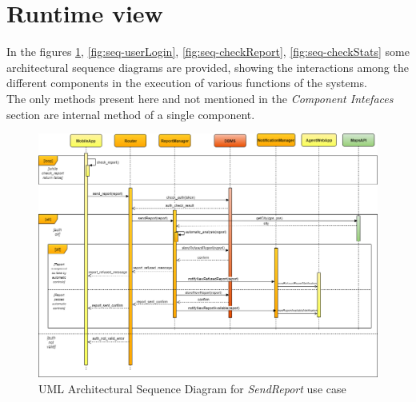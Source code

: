 \documentclass[a4paper]{report}
\begin{document}
\section{Runtime view}
In the figures \ref{fig:seq-sendReport}, \ref{fig:seq-userLogin}, \ref{fig:seq-checkReport}, \ref{fig:seq-checkStats} some architectural sequence diagrams are provided, showing the interactions among the different components in the execution of various functions of the systems. \\
The only methods present here and not mentioned in the \textit{Component Intefaces} section are internal method of a single component.

\begin{landscape}

\begin{figure}[hp]
\includegraphics[angle=0, scale=0.70]{ArchSequenceSendReport}
\caption{UML Architectural Sequence Diagram for \textit{SendReport} use case}
\label{fig:seq-sendReport}
\end{figure}

\end{landscape}
\restoregeometry
\end{document}
